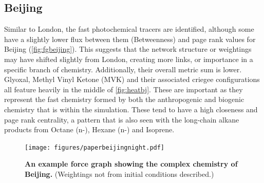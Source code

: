 \subsection*{Beijing}


Similar to London, the fast photochemical tracers are identified, although some have a slightly lower flux between them (Betweenness) and page rank values for Beijing (\autoref{fig:fgbeijing}). This suggests that the network structure or weightings may have shifted slightly from London, creating more links, or importance in a specific branch of chemistry.
 Additionally, their overall metric sum is lower. Glyoxal, Methyl Vinyl Ketone (MVK) and their associated criegee configurations all feature heavily in the middle of \autoref{fig:heatbj}. These are important as they represent the fast chemistry formed by both the anthropogenic and biogenic chemistry that is within the simulation. These tend to have a high closeness and page rank centrality, a pattern that is also seen with the long-chain alkane products from Octane (n-), Hexane (n-) and Isoprene.

 \begin{figure}[H]
      \centering
          \texttt{[image: figures/paperbeijingnight.pdf]}
         \caption{ \textbf{An example force graph showing the complex chemistry of Beijing.} (Weightings not from initial conditions described.)}
         \label{fig:fgbeijing}
 \end{figure}
%

